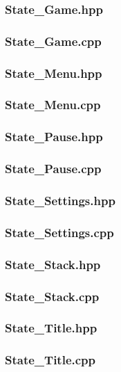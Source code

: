 \subsubsection{State\_Game.hpp}

\subsubsection{State\_Game.cpp}

\subsubsection{State\_Menu.hpp}

\subsubsection{State\_Menu.cpp}

\subsubsection{State\_Pause.hpp}

\subsubsection{State\_Pause.cpp}

\subsubsection{State\_Settings.hpp}

\subsubsection{State\_Settings.cpp}

\subsubsection{State\_Stack.hpp}

\subsubsection{State\_Stack.cpp}

\subsubsection{State\_Title.hpp}

\subsubsection{State\_Title.cpp}

